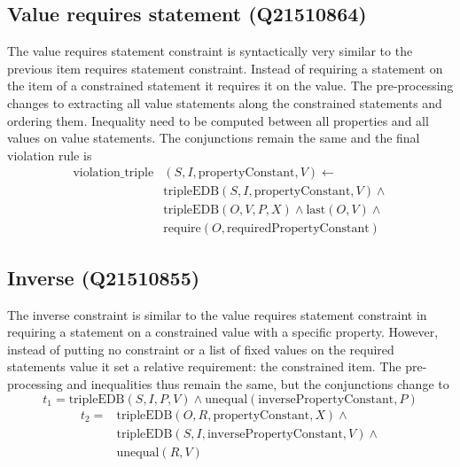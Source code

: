 \documentclass[hyperref,bachelorofscience,fleqn]{cgvpub}
\begin{document}
\subsection{Value requires statement (Q21510864)}
The value requires statement constraint is syntactically very similar to the previous item requires statement constraint. Instead of requiring a statement on the item of a constrained statement it requires it on the value. The pre-processing changes to extracting all value statements along the constrained statements and ordering them. Inequality need to be computed between all properties and all values on value statements. The conjunctions remain the same and the final violation rule is
\begin{equation*}
\begin{split}
\text{violation\_triple}&(S, I, \text{propertyConstant}, V) \leftarrow \\
&\text{tripleEDB}(S, I, \text{propertyConstant}, V) \wedge \\
&\text{tripleEDB}(O, V, P, X) \wedge \text{last}(O, V) \wedge \\
&\text{require}(O, \text{requiredPropertyConstant})
\end{split}
\end{equation*}

\subsection{Inverse (Q21510855)}
The inverse constraint is similar to the value requires statement constraint in requiring a statement on a constrained value with a specific property. However, instead of putting no constraint or a list of fixed values on the required statements value it set a relative requirement: the constrained item. The pre-processing and inequalities thus remain the same, but the conjunctions change to 
\begin{equation*}
t_1 = \text{tripleEDB}(S, I, P, V) \wedge \text{unequal}(\text{inversePropertyConstant}, P)
\end{equation*}
\begin{equation*}
\begin{split}
t_2 = &\text{tripleEDB}(O, R, \text{propertyConstant}, X) \wedge \\
&\text{tripleEDB}(S, I, \text{inversePropertyConstant}, V) \wedge \\
&\text{unequal}(R, V)
\end{split}
\end{equation*}
\end{document}

